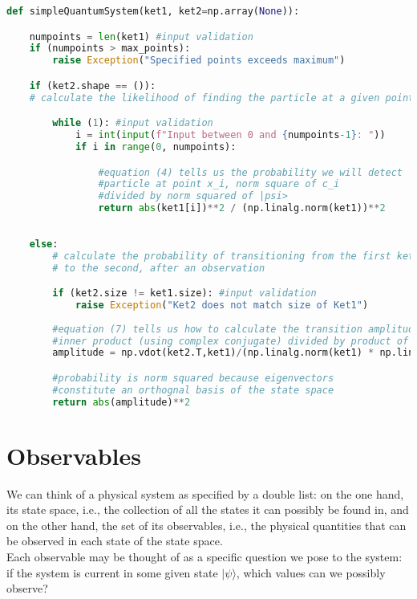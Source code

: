 \documentclass{article}
\begin{document}
\begin{lstlisting}[language=Python]
def simpleQuantumSystem(ket1, ket2=np.array(None)):

    numpoints = len(ket1) #input validation
    if (numpoints > max_points):
        raise Exception("Specified points exceeds maximum")

    if (ket2.shape == ()): 
    # calculate the likelihood of finding the particle at a given point

        while (1): #input validation
            i = int(input(f"Input between 0 and {numpoints-1}: "))
            if i in range(0, numpoints):

                #equation (4) tells us the probability we will detect
                #particle at point x_i, norm square of c_i
                #divided by norm squared of |psi>
                return abs(ket1[i])**2 / (np.linalg.norm(ket1))**2 
               
   
    else:
        # calculate the probability of transitioning from the first ket 
        # to the second, after an observation

        if (ket2.size != ket1.size): #input validation
            raise Exception("Ket2 does not match size of Ket1")
        
        #equation (7) tells us how to calculate the transition amplitude
        #inner product (using complex conjugate) divided by product of norms
        amplitude = np.vdot(ket2.T,ket1)/(np.linalg.norm(ket1) * np.linalg.norm(ket2))

        #probability is norm squared because eigenvectors
        #constitute an orthognal basis of the state space
        return abs(amplitude)**2
\end{lstlisting}

\section{Observables}
We can think of a physical system as specified by a double list: on the one hand, its state space, i.e., the collection of all the states it can possibly be found in, and on the other hand, the set of its observables, i.e., the physical quantities that can be observed in each state of the state space.\\

Each observable may be thought of as a specific question we pose to the system: if the system is current in some given state $|\psi\rangle$, which values can we possibly observe?\\
\end{document}
